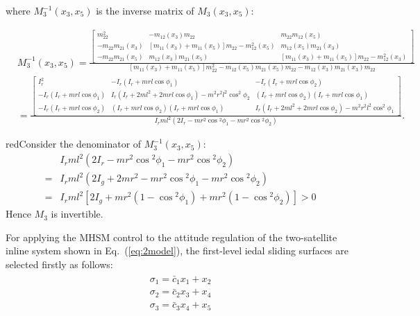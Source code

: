 where $M_3^{-1}(x_3,x_5)$ is the inverse matrix of $M_3(x_3,x_5)$:
\begin{footnotesize}
\begin{align*}
&M_3^{-1}(x_3,x_5)
=\frac{\begin{bmatrix}
m_{22}^2 &-m_{12}(x_3)m_{22} &m_{22}m_{12}(x_5)\\
-m_{22}m_{21}(x_3) &[m_{11}(x_3)+m_{11}(x_5)]m_{22}-m_{12}^2(x_5) &m_{12}(x_5)m_{21}(x_3)\\
-m_{22}m_{21}(x_5) &m_{12}(x_3)m_{21}(x_5) &[m_{11}(x_3)+m_{11}(x_5)]m_{22}-m_{12}^2(x_3)
\end{bmatrix}}{[m_{11}(x_3)+m_{11}(x_5)]m_{22}^2-m_{12}(x_5)m_{21}(x_5)m_{22}-m_{12}(x_3)m_{21}(x_3)m_{22}}\\
&=\frac{\begin{bmatrix}
I_r^2 &-I_r(I_r+mrl\cos\phi_1) &-I_r(I_r+mrl\cos\phi_2)\\
-I_r(I_r+mrl\cos\phi_1) &I_r(I_r+2ml^2+2mrl\cos\phi_1)-m^2r^2l^2\cos^2\phi_2 &(I_r+mrl\cos\phi_2)(I_r+mrl\cos\phi_1)\\
-I_r(I_r+mrl\cos\phi_2) &(I_r+mrl\cos\phi_2)(I_r+mrl\cos\phi_1) &I_r(I_r+2ml^2+2mrl\cos\phi_2)-m^2r^2l^2\cos^2\phi_1
\end{bmatrix}}{I_rml^2(2I_r-mr^2\cos{^2\phi_1}-mr^2\cos{^2\phi_2})}.
\end{align*}
\end{footnotesize}\par
\begin{color}{red}Consider the denominator of $M_3^{-1}(x_3,x_5)$:
\begin{align*}
&I_rml^2(2I_r-mr^2\cos{^2\phi_1}-mr^2\cos{^2\phi_2})\\
=& I_rml^2(2I_g+2mr^2-mr^2\cos{^2\phi_1}-mr^2\cos{^2\phi_2})\\
=& I_rml^2[2I_g+mr^2(1-\cos{^2\phi_1})+mr^2(1-\cos{^2\phi_2})]>0
\end{align*}
Hence $M_{3}$ is invertible.\end{color}\par
For applying the MHSM control to the attitude regulation of the two-satellite inline system shown in Eq.~(\ref{eq:2model}), the first-level iedal sliding surfaces are selected firstly as follows:
\begin{align}
\begin{split}
\sigma_1 = \bar{c}_1x_1+x_2\\
\sigma_2 = \bar{c}_2x_3+x_4\\
\sigma_3 = \bar{c}_3x_4+x_5
\end{split}\label{eq:sigma123}
\end{align}
